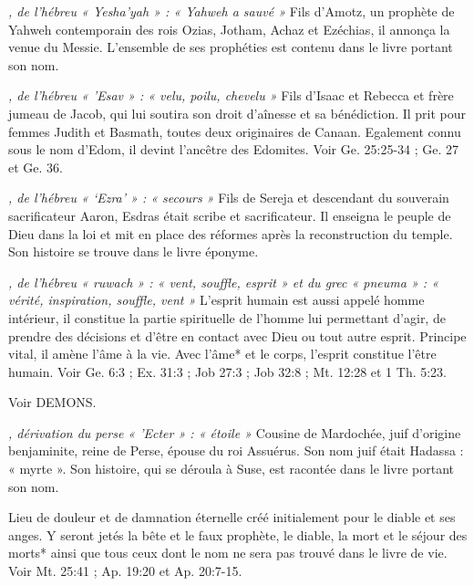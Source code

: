\begin{multicols}{2}
\textit{, de l'hébreu « Yesha'yah » : « Yahweh a sauvé »}\newline
Fils d'Amotz, un prophète de Yahweh contemporain des rois Ozias, Jotham, Achaz et Ezéchias, il annonça la venue du Messie. L'ensemble de ses prophéties est contenu dans le livre portant son nom.

\textit{, de l'hébreu « 'Esav » : « velu, poilu, chevelu »}\newline
Fils d'Isaac et Rebecca et frère jumeau de Jacob, qui lui soutira son droit d'aînesse et sa bénédiction. Il prit pour femmes Judith et Basmath, toutes deux originaires de Canaan. Egalement connu sous le nom d'Edom, il devint l'ancêtre des Edomites. Voir Ge. 25:25-34 ; Ge. 27 et Ge. 36.

\textit{, de l'hébreu « `Ezra' » : « secours »}\newline
Fils de Sereja et descendant du souverain sacrificateur Aaron, Esdras était scribe et sacrificateur. Il enseigna le peuple de Dieu dans la loi et mit en place des réformes après la reconstruction du temple. Son histoire se trouve dans le livre éponyme.

\textit{, de l'hébreu « ruwach » : « vent, souffle, esprit » et du grec « pneuma » : « vérité, inspiration, souffle, vent »}\newline
L'esprit humain est aussi appelé homme intérieur, il constitue la partie spirituelle de l'homme lui permettant d'agir, de prendre des décisions et d'être en contact avec Dieu ou tout autre esprit. Principe vital, il amène l'âme à la vie. Avec l'âme* et le corps, l'esprit constitue l'être humain. Voir Ge. 6:3 ; Ex. 31:3 ; Job 27:3 ; Job 32:8 ; Mt. 12:28 et 1 Th. 5:23.

\textit{}\newline
Voir DEMONS.

\textit{, dérivation du perse « 'Ecter » : « étoile »}\newline
Cousine de Mardochée, juif d'origine benjaminite, reine de Perse, épouse du roi Assuérus. Son nom juif était Hadassa : « myrte ». Son histoire, qui se déroula à Suse, est racontée dans le livre portant son nom.

\textit{}\newline
Lieu de douleur et de damnation éternelle créé initialement pour le diable et ses anges. Y seront jetés la bête et le faux prophète, le diable, la mort et le séjour des morts* ainsi que tous ceux dont le nom ne sera pas trouvé dans le livre de vie. Voir Mt. 25:41 ; Ap. 19:20 et Ap. 20:7-15.


\end{multicols}
